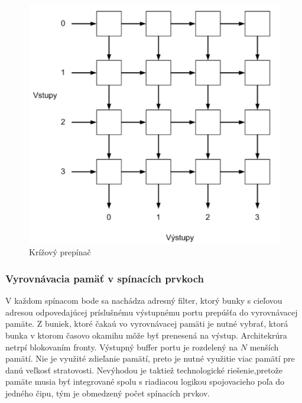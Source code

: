 \begin{figure}[ht]
\centering
  \begin{center}
    \includegraphics[scale=0.8]{BPC-HWS/images/kriz_prep.png}
  \end{center}
  \caption[Krížový prepínač]{Krížový prepínač}
\end{figure}

\subsubsection{Vyrovnávacia pamäť v spínacích prvkoch}
V každom spínacom bode sa nachádza adresný filter, ktorý bunky s cieľovou adresou odpovedajúcej príslušnému výstupnému portu prepúšťa do vyrovnávacej pamäte. Z buniek, ktoré čakaú vo vyrovnávacej pamäti je nutné vybrať, ktorá bunka v ktorom časovo okamihu môže byť prenesená na výstup. Architekrúra netrpí blokovaním fronty. Výstupný buffer portu je rozdelený na $N$ menších pamätí. Nie je využité zdieľanie pamätí, preto je nutné využitie viac pamätí pre danú veľkosť stratovosti. Nevýhodou je taktiež technologické riešenie,pretože pamäte musia byť integrované spolu s riadiacou logikou spojovacieho poľa do jedného čipu, tým je obmedzený počet spínacích prvkov.



